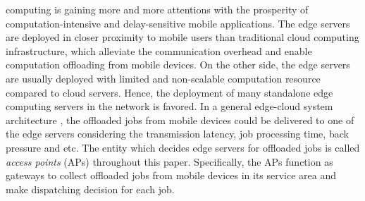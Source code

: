 
 computing is gaining more and more attentions with the prosperity of computation-intensive and delay-sensitive mobile applications. %
The edge servers are deployed in closer proximity to mobile users than traditional cloud computing infrastructure, which alleviate the communication overhead and enable computation offloading from mobile devices.
On the other side, the edge servers are usually deployed with limited and non-scalable computation resource compared to cloud servers.
Hence, the deployment of many standalone edge computing servers in the network is favored.
In a general edge-cloud system architecture \cite{MEC-SURVEY}, the offloaded jobs from mobile devices could be delivered to one of the edge servers considering the transmission latency, job processing time, back pressure and etc.
The entity which decides edge servers for offloaded jobs is called \emph{access points} (APs) throughout this paper.
Specifically, the APs function as gateways to collect offloaded jobs from mobile devices in its service area and make dispatching decision for each job.

